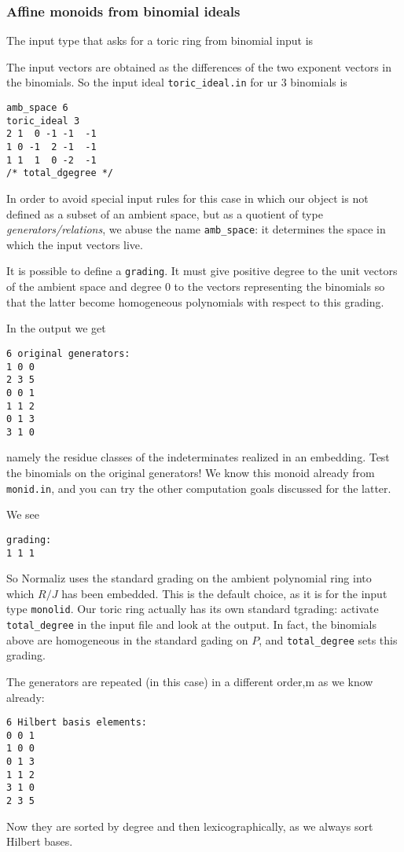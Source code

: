 \subsubsection{Affine monoids from binomial ideals}\label{toric_ideal}
The input type that asks for a toric ring from binomial input is
\begin{itemize}
\end{itemize}
The input vectors are obtained as the differences of the two exponent vectors in the binomials. So the input ideal \verb+toric_ideal.in+ for ur $3$ binomials is
\begin{Verbatim}
amb_space 6
toric_ideal 3
2 1  0 -1 -1  -1
1 0 -1  2 -1  -1
1 1  1  0 -2  -1
/* total_dgegree */
\end{Verbatim}
In order to avoid special input rules for this case in which our object is not defined as a subset of an ambient space, but as a quotient of type \emph{generators/relations}, we abuse the name \verb|amb_space|: it determines the space in which the input vectors live.

It is possible to define a \verb|grading|. It must give positive degree to the unit vectors of the ambient space and degree $0$ to the vectors representing the binomials so that the latter become homogeneous polynomials with respect to this grading.

In the output we get
\begin{Verbatim}
6 original generators:
1 0 0
2 3 5
0 0 1
1 1 2
0 1 3
3 1 0
\end{Verbatim}
namely the residue classes of the indeterminates realized in an embedding. Test the binomials on the original generators! We know this monoid already from \verb|monid.in|, and you can try the other computation goals discussed for the latter.

We see
\begin{Verbatim}
grading:
1 1 1 
\end{Verbatim}
So Normaliz uses the standard grading on the ambient polynomial ring into which $R/J$ has been embedded. This is the default choice, as it is for the input type \verb|monolid|. Our toric ring actually has its own standard tgrading: activate \verb|total_degree| in the input file and look at the output. In fact, the binomials above are homogeneous in the standard gading on $P$, and \verb|total_degree| sets this grading.

The generators are repeated (in this case) in a different order,m as we know already:
\begin{Verbatim}
6 Hilbert basis elements:
0 0 1
1 0 0
0 1 3
1 1 2
3 1 0
2 3 5
\end{Verbatim}
Now they are sorted by degree and then lexicographically, as we always sort Hilbert bases.

